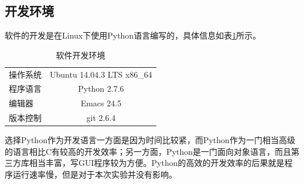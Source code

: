 \documentclass[a4paper, 12pt]{article}
\begin{document}
\subsection{开发环境}
软件的开发是在Linux下使用Python语言编写的，具体信息如表\ref{tab:1}所示。
\begin{table}[ht]
  \centering
  \caption{软件开发环境}
  \label{tab:1}
  \begin{tabular}{lc}
    \toprule
    操作系统 & Ubuntu 14.04.3 LTS x86\_64\\
    程序语言 & Python 2.7.6\\
    编辑器 & Emacs 24.5\\
    版本控制 & git 2.6.4\\
    \bottomrule
  \end{tabular}
\end{table}
选择Python作为开发语言一方面是因为时间比较紧，而Python作为一门相当高级的语言相比C有较高的开发效率；另一方面，Python是一门面向对象语言，而且第三方库相当丰富，写GUI程序较为方便。Python的高效的开发效率的后果就是程序运行速率慢，但是对于本次实验并没有影响。
\end{document}

